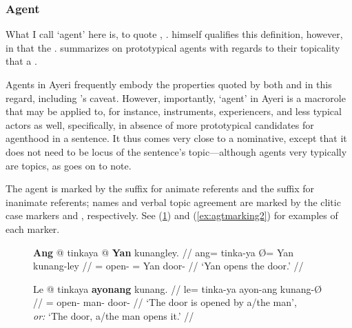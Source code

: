 \subsubsection{Agent}
\label{subsubsec:agent}

What I call `agent' here is, to quote \citet{fillmore1968},
. \citet{fillmore1968}
himself qualifies this definition, however, in that the . \citet{payne1997} summarizes on prototypical agents with regards
to their topicality that a .

Agents in Ayeri frequently embody the properties quoted by both
\citet{fillmore1968} and \citet{payne1997} in this regard, including 
\citet{fillmore1968}'s caveat. However, importantly, `agent' in Ayeri is 
a macrorole that may be applied to, for instance, instruments, experiencers,
and less typical actors as well, specifically, in absence of more prototypical
candidates for agenthood in a sentence. It thus comes very close to a
nominative, except that it does not need to be locus of the sentence's
topic---although agents very typically are topics, as
\citet[151]{payne1997} goes on to note.

The agent is marked by the suffix  for animate referents and
the suffix  for inanimate referents; names and verbal topic
agreement are marked by the clitic case markers  and
, respectively. See (\ref{ex:agtmarking1}) and
(\ref{ex:agtmarking2}) for examples of each marker.

\begin{figure}
\pex\label{ex:agtmarking1}
\a\begingl
	\gla \textbf{Ang} @ tinkaya {} @ \textbf{Yan} kunangley. //
	\glb ang= tinka-ya Ø= Yan kunang-ley //
	\glc \AgtT{}= open-\TsgM{} \Top{}= Yan door-\PargI{} //
	\glft `Yan opens the door.' //
\endgl

\a\begingl
	\gla Le @ tinkaya \textbf{ayonang} kunang. //
	\glb le= tinka-ya ayon-ang kunang-Ø //
	\glc \PatT{}= open-\TsgM{} man-\Aarg{} door-\Top{} //
	\glft `The door is opened by a/the man',\\
		\textit{or:} `The door, a/the man opens it.' //
\endgl
\xe
\end{figure}

